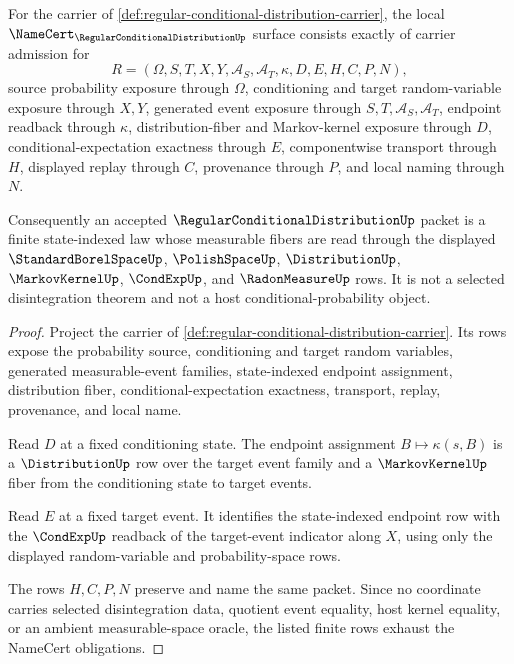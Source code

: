 \begin{theorem}
\label{thm:regular-conditional-distribution-namecert-obligations}
For the carrier of \autoref{def:regular-conditional-distribution-carrier}, the local $\NameCert_{\RegularConditionalDistributionUp}$ surface consists exactly of carrier admission for
$$
R=(\Omega,S,T,X,Y,\mathcal{A}_S,\mathcal{A}_T,\kappa,D,E,H,C,P,N),
$$
source probability exposure through $\Omega$, conditioning and target random-variable exposure through $X,Y$, generated event exposure through $S,T,\mathcal{A}_S,\mathcal{A}_T$, endpoint readback through $\kappa$, distribution-fiber and Markov-kernel exposure through $D$, conditional-expectation exactness through $E$, componentwise transport through $H$, displayed replay through $C$, provenance through $P$, and local naming through $N$.

Consequently an accepted $\RegularConditionalDistributionUp$ packet is a finite state-indexed law whose measurable fibers are read through the displayed $\StandardBorelSpaceUp$, $\PolishSpaceUp$, $\DistributionUp$, $\MarkovKernelUp$, $\CondExpUp$, and $\RadonMeasureUp$ rows. It is not a selected disintegration theorem and not a host conditional-probability object.
\end{theorem}
\begin{proof}
Project the carrier of \autoref{def:regular-conditional-distribution-carrier}. Its rows expose the probability source, conditioning and target random variables, generated measurable-event families, state-indexed endpoint assignment, distribution fiber, conditional-expectation exactness, transport, replay, provenance, and local name.

Read $D$ at a fixed conditioning state. The endpoint assignment $B\mapsto\kappa(s,B)$ is a $\DistributionUp$ row over the target event family and a $\MarkovKernelUp$ fiber from the conditioning state to target events.

Read $E$ at a fixed target event. It identifies the state-indexed endpoint row with the $\CondExpUp$ readback of the target-event indicator along $X$, using only the displayed random-variable and probability-space rows.

The rows $H,C,P,N$ preserve and name the same packet. Since no coordinate carries selected disintegration data, quotient event equality, host kernel equality, or an ambient measurable-space oracle, the listed finite rows exhaust the NameCert obligations.
\end{proof}

